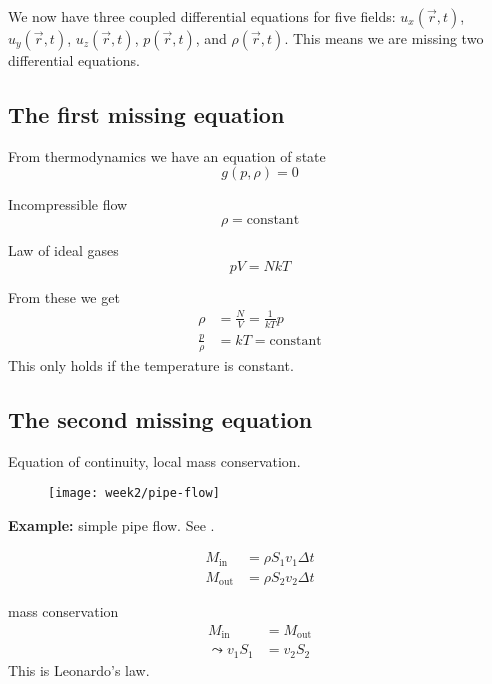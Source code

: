 We now have three coupled differential equations for five fields: $u_x\left(\vec{r},t\right)$, $u_y\left(\vec{r},t\right)$, $u_z\left(\vec{r},t\right)$, $p\left(\vec{r},t\right)$, and $\rho\left(\vec{r},t\right)$. This means we are missing two differential equations.


\subsection*{The first missing equation}
From thermodynamics we have an equation of state
\begin{equation}
g(p,\rho)=0
\end{equation}

Incompressible flow
\begin{equation}
\rho = \mathrm{constant}
\end{equation}

Law of ideal gases
\begin{equation}
pV=NkT
\end{equation}

From these we get
\begin{align}
\rho &= \frac{N}{V} = \frac{1}{kT}p\\
\frac{p}{\rho} &= kT = \mathrm{constant}
\end{align}
This only holds if the temperature is constant.


\subsection*{The second missing equation}
Equation of continuity, local mass conservation.

\begin{figure}[!h]
    \centering
    \texttt{[image: week2/pipe-flow]}
    \caption{}
    \label{fig:pipe-flow}
\end{figure}

\begin{framed}
\textbf{Example:} simple pipe flow. See .

\begin{align}
M_\mathrm{in} &= \rho S_1v_1\Delta t \\
M_\mathrm{out} &= \rho S_2v_2\Delta t
\end{align}

mass conservation
\begin{align}
M_\mathrm{in} &= M_\mathrm{out}\\
\leadsto
v_1S_1 &= v_2S_2
\end{align}
This is Leonardo's law.
\end{framed}

